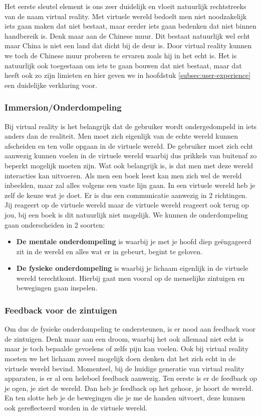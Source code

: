 Het eerste sleutel element is ons zeer duidelijk en vloeit natuurlijk rechtstreeks van de naam virtual reality. Met virtuele wereld bedoelt men niet noodzakelijk iets gaan maken dat niet bestaat, maar eerder iets gaan bedenken dat niet binnen handbereik is. Denk maar aan de Chinese muur. Dit bestaat natuurlijk wel echt maar China is niet een land dat dicht bij de deur is. Door virtual reality kunnen we toch de Chinese muur proberen te ervaren zoals hij in het echt is. Het is natuurlijk ook toegestaan om iets te gaan bouwen dat niet bestaat, maar dat heeft ook zo zijn limieten en hier geven we in hoofdstuk \ref{subsec:user-experience} een duidelijke verklaring voor.

\subsubsection{Immersion/Onderdompeling}
\label{ssubsec:immersion}
Bij virtual reality is het belangrijk dat de gebruiker wordt ondergedompeld in iets anders dan de realiteit. Men moet zich eigenlijk van de echte wereld kunnen afscheiden en ten volle opgaan in de virtuele wereld. De gebruiker moet zich echt aanwezig kunnen voelen in de virtuele wereld waarbij dus prikkels van buitenaf zo beperkt mogelijk moeten zijn. Wat ook belangrijk is, is dat men met deze wereld interacties kan uitvoeren. Als men een boek leest kan men zich wel de wereld inbeelden, maar zal alles volgens een vaste lijn gaan. In een virtuele wereld heb je zelf de keuze wat je doet. Er is dus een communicatie aanwezig in 2 richtingen. Jij reageert op de virtuele wereld maar de virtuele wereld reageert ook terug op jou, bij een boek is dit natuurlijk niet mogelijk. We kunnen de onderdompeling gaan onderscheiden in 2 soorten:

\begin{itemize}
	\item \textbf{De mentale onderdompeling} is waarbij je met je hoofd diep geëngageerd zit in de wereld en alles wat er in gebeurt, begint te geloven.
	\item \textbf{De fysieke onderdompeling} is waarbij je lichaam eigenlijk in de virtuele wereld terechtkomt. Hierbij gaat men vooral op de menselijke zintuigen en bewegingen gaan inspelen.
\end{itemize}

\subsubsection{Feedback voor de zintuigen}
\label{ssubsec:feedback-van-zintuigen}
Om dus de fysieke onderdompeling te ondersteunen, is er nood aan feedback voor de zintuigen. Denk maar aan een droom, waarbij het ook allemaal niet echt is maar je toch bepaalde gevoelens of zelfs pijn kan voelen. Ook bij virtual reality moeten we het lichaam zoveel mogelijk doen denken dat het zich echt in de virtuele wereld bevind. Momenteel, bij de huidige generatie van virtual reality apparaten, is er al een heleboel feedback aanwezig. Ten eerste is er de feedback op je ogen, je ziet de wereld. Dan heb je feedback op het gehoor, je hoort de wereld. En ten slotte heb je de bewegingen die je me de handen uitvoert, deze kunnen ook gereflecteerd worden in de virtuele wereld.

